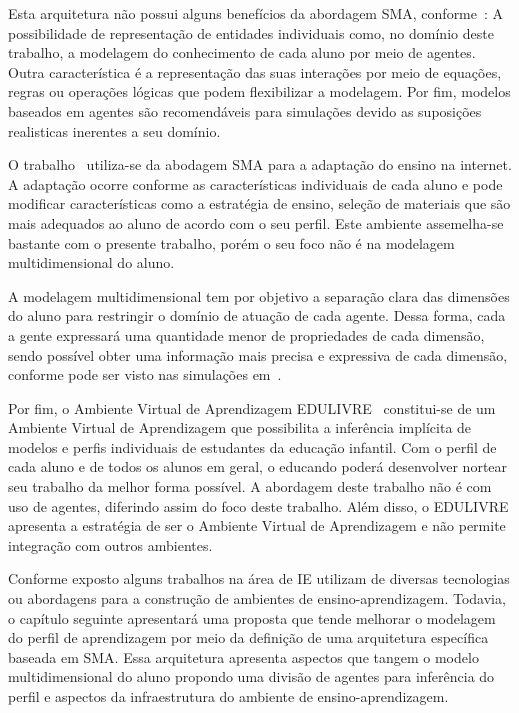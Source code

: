 Esta arquitetura não possui alguns benefícios da abordagem SMA, conforme~\cite{helbing11}: A possibilidade de representação de entidades individuais como, no domínio  deste trabalho, a modelagem do conhecimento de cada aluno por meio de agentes. Outra característica é  a representação das suas interações por meio de equações, regras ou operações lógicas que podem flexibilizar a modelagem. Por fim, modelos baseados em agentes são recomendáveis para simulações devido as suposições realisticas inerentes a seu domínio.

O trabalho~\cite{geyer2001semeai} utiliza-se da abodagem SMA para a adaptação do ensino na internet. A adaptação ocorre conforme as características individuais de cada aluno e pode modificar características como a estratégia de ensino, seleção de materiais que são mais adequados ao aluno de acordo com o seu perfil. Este ambiente assemelha-se bastante com o presente trabalho, porém o seu foco não é na modelagem multidimensional do aluno.

A modelagem multidimensional tem por objetivo a separação clara das dimensões do aluno para restringir o domínio de atuação de cada agente. Dessa forma, cada a gente expressará uma quantidade menor de propriedades de cada dimensão, sendo possível obter uma informação mais precisa e expressiva de cada dimensão, conforme pode ser visto nas simulações em~\cite{helbing11}.

Por fim, o Ambiente Virtual de Aprendizagem EDULIVRE~\cite{rabelo2010identificacao} constitui-se de um Ambiente Virtual de Aprendizagem que possibilita a inferência implícita de modelos e perfis individuais de estudantes da educação infantil. Com o perfil de cada aluno e de todos os alunos em geral, o educando poderá desenvolver nortear seu trabalho da melhor forma possível. A abordagem deste trabalho não é com uso de agentes, diferindo assim do foco deste trabalho. Além disso, o EDULIVRE apresenta a estratégia de ser o Ambiente Virtual de Aprendizagem e não permite integração com outros ambientes.

Conforme exposto alguns trabalhos na área de IE utilizam de diversas tecnologias ou abordagens para a construção de ambientes de ensino-aprendizagem. Todavia, o capítulo seguinte apresentará uma proposta que tende melhorar o modelagem do perfil de aprendizagem por meio da definição de uma arquitetura específica baseada em SMA. Essa arquitetura apresenta aspectos que tangem o modelo multidimensional do aluno propondo uma divisão de agentes para inferência do perfil e aspectos da infraestrutura do ambiente de ensino-aprendizagem.














